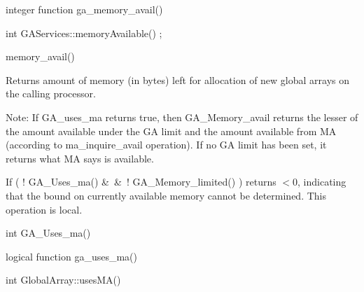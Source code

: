 \documentclass[12pt]{article}
\begin{document}
\begin{fapi}
\begin{fcode}
integer function ga_memory_avail()
\end{fcode}
\end{fapi}

\begin{cxxapi}
\begin{cxxcode}
int GAServices::memoryAvailable() ;
\end{cxxcode}
\end{cxxapi}

\begin{pyapi}
\begin{pycode}
memory_avail()
\end{pycode}
\end{pyapi}

\local

\begin{desc}

Returns amount of memory (in bytes) left for allocation of new global
arrays on the calling processor.

Note: If GA_uses_ma returns true, then GA_Memory_avail returns the lesser
of the amount available under the GA limit and the amount available from MA
(according to ma_inquire_avail operation). If no GA limit has been set, it
returns what MA says is available.

If ( ! GA_Uses_ma() \&\ \&\ ! GA_Memory_limited() ) returns $< 0$, indicating
that the bound on currently available memory cannot be determined.
This operation is local.
\end{desc}


\begin{capi}
\begin{ccode}
int GA_Uses_ma()
\end{ccode}
\end{capi}

\begin{fapi}
\begin{fcode}
logical function ga_uses_ma()
\end{fcode}
\end{fapi}

\begin{cxxapi}
\begin{cxxcode}
int GlobalArray::usesMA()
\end{cxxcode}
\end{cxxapi}
\end{document}
